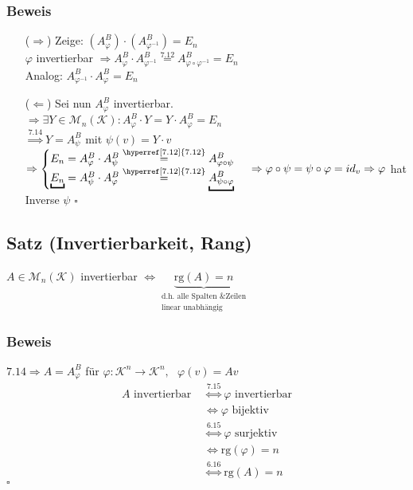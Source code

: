 \documentclass[a4paper, 12pt,titlepage, pdf, headsepline]{scrartcl}
\newcommand{\K}{\mathcal{K}}
\newcommand{\M}{\mathcal{M}}
\newcommand{\rg}{\textrm{rg}}
\newcommand{\qed}{\hfill$\square$}
\renewcommand{\>}{\rightarrow}
\renewcommand{\*}{\cdot}
\renewcommand{\phi}{\varphi}
\begin{document}
\subsubsection*{Beweis}
\begin{itemize}
	\item[($\Rightarrow$)] Zeige: $(A_\phi^B) \cdot (A_{\phi^{-1}}^B) = E_n$\\
	$\phi$ invertierbar $\Rightarrow A_\phi^B \cdot A_{\phi^{-1}}^B \overset{\hyperref[7.12]{7.12}}{=} A_{\phi \circ \phi^{-1}}^B = E_n$\\
	Analog: $A_{\phi^{-1}}^B \cdot A_\phi^B = E_n$
	\item[($\Leftarrow$)] Sei nun $A_\phi^B$ invertierbar. \\
	$\Rightarrow \exists Y \in \M_n(\K): A_\phi^B \cdot Y = Y \cdot A_\phi^B = E_n$\\
	$\overset{\hyperref[7.14]{7.14}}{\Rightarrow} Y = A_\psi^B$ mit $\psi(v) = Y\*v$\\
	$\Rightarrow \begin{cases}
	E_n = A_\phi^B \cdot A_\psi^B \overset{\hyperref[7.12]{7.12}}{=} A_{\phi \circ \psi}^B\\
	\underbracket{E_n} = A_\psi^B \cdot A_\phi^B \overset{\hyperref[7.12]{7.12}}{=} \underbracket{A_{\psi \circ \phi}^B}
	\end{cases}\\
	\Rightarrow \phi \circ \psi = \psi \circ \phi = id_v\\
	\Rightarrow \phi$ hat Inverse $\psi$ \qed
\end{itemize}
\subsection{Satz (Invertierbarkeit, Rang)}
\label{7.16}
$A \in \M_n(\K)$ invertierbar $\Leftrightarrow \underbrace{\rg(A) = n}_{\substack{\text{d.h. alle Spalten \& Zeilen}\\\text{linear unabhängig}}}$
\subsubsection*{Beweis}
$\hyperref[7.14]{7.14} \Rightarrow A = A_\phi^B$ für $\phi:\K^n \rightarrow \K^n,~~~ \phi(v) = Av$\\
\begin{align*}
A \text{ invertierbar } &\overset{\hyperref[7.15]{7.15}}{\Leftrightarrow} \phi \text{ invertierbar} \\
&\Leftrightarrow \phi \text{ bijektiv }\\
&\overset{\hyperref[6.15]{6.15}}{\Leftrightarrow} \phi \text{ surjektiv}\\
&\Leftrightarrow \rg(\phi) = n\\
&\overset{\hyperref[6.16]{6.16}}{\Leftrightarrow} \rg(A) = n
\end{align*}
\qed
\end{document}
